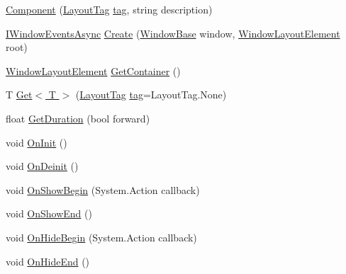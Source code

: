 \begin{DoxyCompactItemize}
\item 
\hyperlink{class_unity_engine_1_1_u_i_1_1_windows_1_1_types_1_1_layout_1_1_component_a603ac4fcb516a0e3823d90c46ff90770}{Component} (\hyperlink{namespace_unity_engine_1_1_u_i_1_1_windows_a954ff5db0de6295464f3b95598158333}{Layout\+Tag} \hyperlink{class_unity_engine_1_1_u_i_1_1_windows_1_1_types_1_1_layout_1_1_component_a2f5b6889d2d9f2143ab64e8579d28d0c}{tag}, string description)
\item 
\hyperlink{interface_unity_engine_1_1_u_i_1_1_windows_1_1_i_window_events_async}{I\+Window\+Events\+Async} \hyperlink{class_unity_engine_1_1_u_i_1_1_windows_1_1_types_1_1_layout_1_1_component_aa29a08819dfa955e12e06cdcd2d6a52e}{Create} (\hyperlink{class_unity_engine_1_1_u_i_1_1_windows_1_1_window_base}{Window\+Base} window, \hyperlink{class_unity_engine_1_1_u_i_1_1_windows_1_1_window_layout_element}{Window\+Layout\+Element} root)
\item 
\hyperlink{class_unity_engine_1_1_u_i_1_1_windows_1_1_window_layout_element}{Window\+Layout\+Element} \hyperlink{class_unity_engine_1_1_u_i_1_1_windows_1_1_types_1_1_layout_1_1_component_ae1e7b612d83937a16b3f8a060315c015}{Get\+Container} ()
\item 
T \hyperlink{class_unity_engine_1_1_u_i_1_1_windows_1_1_types_1_1_layout_1_1_component_acdf44f0ec979bdba9d8caa9b8c118395}{Get$<$ T $>$} (\hyperlink{namespace_unity_engine_1_1_u_i_1_1_windows_a954ff5db0de6295464f3b95598158333}{Layout\+Tag} \hyperlink{class_unity_engine_1_1_u_i_1_1_windows_1_1_types_1_1_layout_1_1_component_a2f5b6889d2d9f2143ab64e8579d28d0c}{tag}=Layout\+Tag.\+None)
\item 
float \hyperlink{class_unity_engine_1_1_u_i_1_1_windows_1_1_types_1_1_layout_1_1_component_a4a71d0d105f4a2ddf17194afccc07e67}{Get\+Duration} (bool forward)
\item 
void \hyperlink{class_unity_engine_1_1_u_i_1_1_windows_1_1_types_1_1_layout_1_1_component_a7f51276760fa744753b83f0f8514a800}{On\+Init} ()
\item 
void \hyperlink{class_unity_engine_1_1_u_i_1_1_windows_1_1_types_1_1_layout_1_1_component_af2dbb4b9d7070759dc1d694a15365daf}{On\+Deinit} ()
\item 
void \hyperlink{class_unity_engine_1_1_u_i_1_1_windows_1_1_types_1_1_layout_1_1_component_a31ed1cd295d09a9c41dbd9136b6b57b1}{On\+Show\+Begin} (System.\+Action callback)
\item 
void \hyperlink{class_unity_engine_1_1_u_i_1_1_windows_1_1_types_1_1_layout_1_1_component_a21c7c878e9c1729e13af0ec19ac0e3e9}{On\+Show\+End} ()
\item 
void \hyperlink{class_unity_engine_1_1_u_i_1_1_windows_1_1_types_1_1_layout_1_1_component_a22dd04bcfa36fba667a9df8fac3762b5}{On\+Hide\+Begin} (System.\+Action callback)
\item 
void \hyperlink{class_unity_engine_1_1_u_i_1_1_windows_1_1_types_1_1_layout_1_1_component_af0e7cd8db52c1cf839e182aaa2dbc511}{On\+Hide\+End} ()
\end{DoxyCompactItemize}

